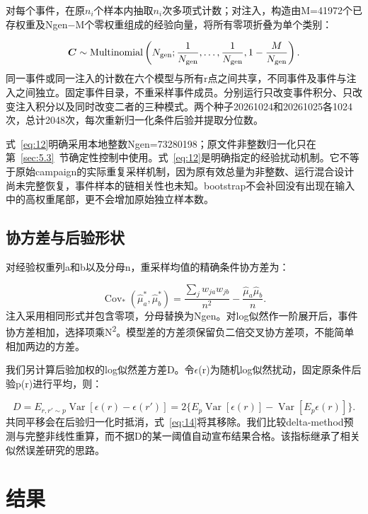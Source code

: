 \documentclass[UTF8,a4paper,11pt,fontset=fandol]{ctexart}
\begin{document}
对每个事件，在原\(n_{i}\)个样本内抽取\(n_{i}\)次多项式计数；对注入，构造由M=41972个已存权重及Ngen\(-\)M个零权重组成的经验向量，将所有零项折叠为单个类别：

\begin{equation}\label{eq:12}
\boldsymbol{C}\sim{\rm Multinomial}\left(N_{\rm gen};\frac{1}{N_{\rm gen}},\ldots,\frac{1}{N_{\rm gen}},1-\frac{M}{N_{\rm gen}}\right).
\end{equation}
同一事件或同一注入的计数在六个模型与所有r点之间共享，不同事件及事件与注入之间独立。固定事件目录，不重采样事件成员。分别运行只改变事件积分、只改变注入积分以及同时改变二者的三种模式。两个种子20261024和20261025各1024次，总计2048次，每次重新归一化条件后验并提取分位数。

式~\eqref{eq:12}明确采用本地整数Ngen=73280198；原文件非整数归一化只在第~\ref{sec:5.3}~节确定性控制中使用。式~\eqref{eq:12}是明确指定的经验扰动机制。它不等于原始campaign的实际重复采样机制，因为原有效总量为非整数、运行混合设计尚未完整恢复，事件样本的链相关性也未知。bootstrap不会补回没有出现在输入中的高权重尾部，更不会增加原始独立样本数。

\subsection{协方差与后验形状}\label{sec:6.2}
对经验权重列a和b以及分母n，重采样均值的精确条件协方差为：

\begin{equation}\label{eq:13}
\operatorname{Cov}_*(\widehat{\mu}_a^*,\widehat{\mu}_b^*)=\frac{\sum_j w_{ja}w_{jb}}{n^2}-\frac{\widehat{\mu}_a\widehat{\mu}_b}{n}.
\end{equation}
注入采用相同形式并包含零项，分母替换为Ngen。对log似然作一阶展开后，事件协方差相加，选择项乘N\textsuperscript{2}。模型差的方差须保留负二倍交叉协方差项，不能简单相加两边的方差。

我们另计算后验加权的log似然差方差D。令\(\epsilon\)(r)为随机log似然扰动，固定原条件后验p(r)进行平均，则：

\begin{equation}\label{eq:14}
D=E_{r,r'\sim p}\operatorname{Var}[\epsilon(r)-\epsilon(r')]=2\{E_p\operatorname{Var}[\epsilon(r)]-\operatorname{Var}[E_p\epsilon(r)]\}.
\end{equation}
共同平移会在后验归一化时抵消，式~\eqref{eq:14}将其移除。我们比较delta-method预测与完整非线性重算，而不据D的某一阈值自动宣布结果合格。该指标继承了相关似然误差研究的思路\cite{ref3,ref4}。

\FloatBarrier
\section{结果}\label{sec:7}
\end{document}
